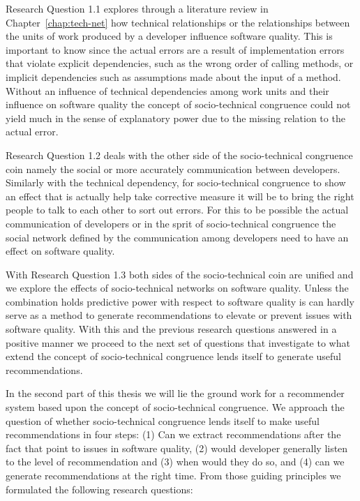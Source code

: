 Research Question 1.1 explores through a literature review in Chapter~\ref{chap:tech-net} how technical relationships or the relationships between the units of work produced by a developer influence software quality.
This is important to know since the actual errors are a result of implementation errors that violate explicit dependencies, such as the wrong order of calling methods, or implicit dependencies such as assumptions made about the input of a method. 
Without an influence of technical dependencies among work units and their influence on software quality the concept of socio-technical congruence could not yield much in the sense of explanatory power due to the missing relation to the actual error.

Research Question 1.2 deals with the other side of the socio-technical congruence coin namely the social or more accurately communication between developers.
Similarly with the technical dependency, for socio-technical congruence to show an effect that is actually help take corrective measure it will be to bring the right people to talk to each other to sort out errors. 
For this to be possible the actual communication of developers or in the sprit of socio-technical congruence the social network defined by the communication among developers need to have an effect on software quality.

With Research Question 1.3 both sides of the socio-technical coin are unified and we explore the effects of socio-technical networks on software quality.
Unless the combination holds predictive power with respect to software quality is can hardly serve as a method to generate recommendations to elevate or prevent issues with software quality.
With this and the previous research questions answered in a positive manner we proceed to the next set of questions that investigate to what extend the concept of socio-technical congruence lends itself to generate useful recommendations.

In the second part of this thesis we will lie the ground work for a recommender system based upon the concept of socio-technical congruence.
We approach the question of whether socio-technical congruence lends itself to make useful recommendations in four steps: (1) Can we extract recommendations after the fact that point to issues in software quality, (2) would developer generally listen to the level of recommendation and (3) when would they do so, and (4) can we generate recommendations at the right time.
From those guiding principles we formulated the following research questions:

